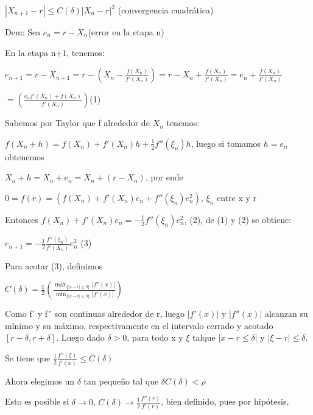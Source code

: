 \documentclass{article}
\begin{document}
$\left| X_{n+1} - r  \right | \leq C(\delta) \left | X_n -r  \right |^2 $ (convergencia cuadrática)

\vspace{5mm}


Dem: Sea $e_n = r - X_n $(error en la etapa n)

 En la etapa n+1, tenemos: 

 $ e_{n+1} = r - X_{n+1} = r - \left(X_n - \displaystyle\frac{f(X_n)}{f'(X_n)} \right)  = r - X_n +\displaystyle\frac{f(X_n)}{f'(X_n)}
 = e_n + \displaystyle\frac{f(X_n)}{f'(X_n)}$

 $ =  \left( \displaystyle\frac{e_nf'(X_n)+f(X_n)}{f'(X_n)} \right) $(1)

 \vspace{5mm}

 Sabemos por Taylor que f alrededor de $X_n$ tenemos:


 $f(X_n+h)=f(X_n)+f'(X_n)h+\frac{1}{2}f''(\xi_n)h$, luego si tomamos $h=e_n$ obtenemos


 $X_n+h = X_n+e_n = X_n + (r-X_n)$, por ende


 $0 = f(r) = (f(X_n) + f'(X_n)e_n + f''(\xi_n)e_n^2)$, $\xi_n$ entre x y r

 Entonces $f(X_n)+f'(X_n)e_n = -\frac{1}{2}f''(\xi_n)e_n^2 $, (2), de (1) y (2) se obtiene:


 $e_{n+1} = -\frac{1}{2}\frac{f''(\xi_n)}{f'(X_n)}e_n^2$ (3)

\vspace{5mm}

 Para acotar (3), definimos


 $C(\delta) = \frac{1}{2}\left( \displaystyle\frac{\max_{\{|x-r| \leq \delta\}} |f''(x)|}{\min_{\{|x-r| \leq \delta\}}|f'(x)|} \right)$

 \vspace{5mm}

 Como f' y f'' son continuas alrededor de r, luego $|f'(x)|$ y $|f''(x)|$ alcanzan su mínimo y su máximo, respectivamente
 en el intervalo cerrado y acotado $[r-\delta,r+\delta]$. Luego dado $\delta > 0$, para todo x y $\xi$ talque $|x-r \leq \delta|$
 y $|\xi-r| \leq \delta$.


 Se tiene que $\frac{1}{2}\frac{f''(\xi)}{f'(x)} \leq C(\delta)$

 \vspace{5mm}

 Ahora elegimos un $ \delta  $ tan pequeño tal que $ \delta C(\delta) < \rho $

Esto es posible si $\delta \rightarrow 0$, $C(\delta) \rightarrow \frac{1}{2}\frac{f''(r)}{f'(r)}$, bien
definido, pues por hipótesis,
\end{document}
